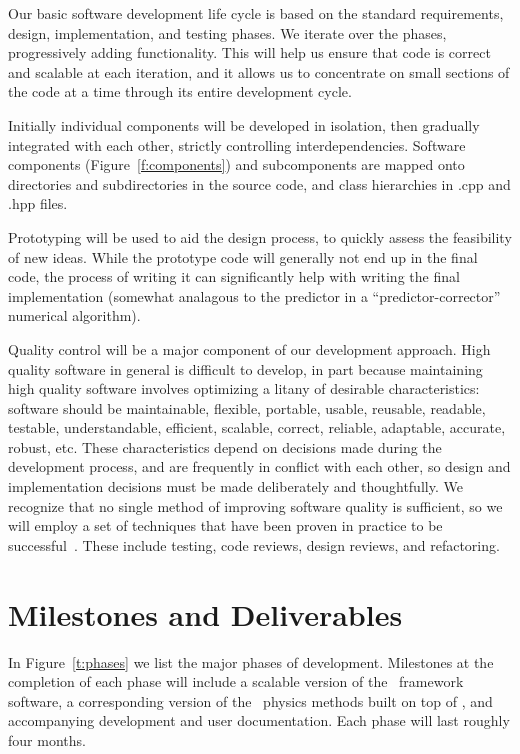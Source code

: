 \documentclass[10pt,twocolumn]{article}
\begin{document}
Our basic software development life cycle is based on the standard
requirements, design, implementation, and testing phases.  We iterate
over the phases, progressively adding functionality.  This will help
us ensure that code is correct and scalable at each iteration, and it
allows us to concentrate on small sections of the code at a time
through its entire development cycle.  

Initially individual components will be developed in isolation, then
gradually integrated with each other, strictly controlling
interdependencies.  Software components (Figure~\ref{f:components})
and subcomponents are mapped onto directories and subdirectories in
the source code, and class hierarchies in .cpp and .hpp files.

Prototyping will be used to aid the design process, to quickly assess
the feasibility of new ideas.  While the prototype code will generally
not end up in the final code, the process of writing it can
significantly help with writing the final implementation (somewhat
analagous to the predictor in a ``predictor-corrector'' numerical
algorithm).

Quality control will be a major component of our development approach.
High quality software in general is difficult to develop, in part
because maintaining high quality software involves optimizing a litany
of desirable characteristics: software should be maintainable,
flexible, portable, usable, reusable, readable, testable,
understandable, efficient, scalable, correct, reliable, adaptable,
accurate, robust, etc.  These characteristics depend on decisions made
during the development process, and are frequently in conflict with
each other, so design and implementation decisions must be made
deliberately and thoughtfully.  We recognize that no single method of
improving software quality is sufficient, so we will employ a set of
techniques that have been proven in practice to be
successful~\cite{Mc04}.  These include testing, code reviews, design
reviews, and refactoring.



\section{Milestones and Deliverables} \label{s:milestones}

In Figure~\ref{t:phases} we list the major phases of development.
Milestones at the completion of each phase will include a scalable
version of the \cello\ framework software, a corresponding version of
the \enzoii\ physics methods built on top of \cello, and accompanying
development and user documentation.  Each phase will last roughly four
months.
\end{document}
